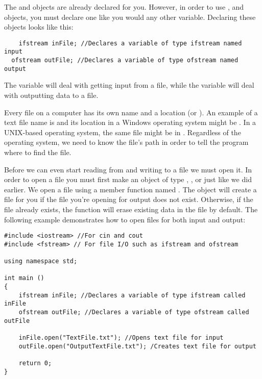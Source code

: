 The  and  objects are already declared for you. 
However, in order to use ,  and  objects, you must declare one like you would any other variable. 
Declaring these objects looks like this:

\begin{lstlisting}
	ifstream inFile; //Declares a variable of type ifstream named input
  ofstream outFile; //Declares a variable of type ofstream named output
\end{lstlisting}

The variable  will deal with getting input from a file, while the variable  will deal with outputting data to a file. 

Every file on a computer has its own name and a location (or ).
An example of a text file name is  and its location in a Windows operating system might be . 
In a UNIX-based operating system, the same file might be in . 
Regardless of the operating system, we need to know the file's path in order to tell the program where to find the file. 


Before we can even start reading from and writing to a file we must open it. 
In order to open a file you must first make an object of type , , or  just like we did earlier. 
We open a file using a member function named . 
The  object will create a file for you if the file you're opening for output does not exist.
Otherwise, if the file already exists, the  function will erase existing data in the file by default. 
The following example demonstrates how to open files for both input and output:

\begin{lstlisting}
#include <iostream> //For cin and cout 
#include <fstream> // For file I/O such as ifstream and ofstream
		
using namespace std;
		
int main ()
{
	ifstream inFile; //Declares a variable of type ifstream called inFile
	ofstream outFile; //Declares a variable of type ofstream called outFile
	
	inFile.open("TextFile.txt"); //Opens text file for input
	outFile.open("OutputTextFile.txt"); /Creates text file for output
	
	return 0;
}
\end{lstlisting}

